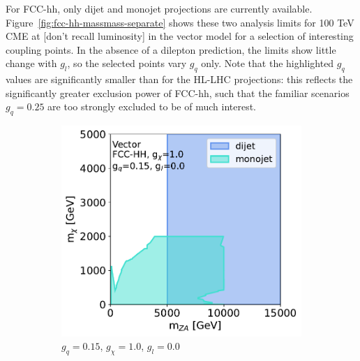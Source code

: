 \documentclass[11pt]{article}
\begin{document}
For FCC-hh, only dijet and monojet projections are currently available. Figure~\ref{fig:fcc-hh-massmass-separate} shows these two analysis limits for 100 TeV CME at [don't recall luminosity] in the vector model for a selection of interesting coupling points. In the absence of a dilepton prediction, the limits show little change with $g_{l}$, so the selected points vary $g_q$ only. Note that the highlighted $g_q$ values are significantly smaller than for the HL-LHC projections: this reflects the significantly greater exclusion power of FCC-hh, such that the familiar scenarios $g_q = 0.25$ are too strongly excluded to be of much interest.

\begin{figure}
     \centering
     \begin{subfigure}[b]{0.49\textwidth}
         \centering
         \includegraphics[width=\textwidth]{SummaryPlots-EF10/figures/massmass/fcc-hh/massmass_vector_gq0.15_gdm1.0_gl0.0.pdf}
         \caption{$g_q=0.15$, $g_{\chi}=1.0$, $g_l=0.0$}
         \label{subfig:vector-fcc-v1}
     \end{subfigure}
     \hfill
     \begin{subfigure}[b]{0.49\textwidth}
         \centering

\end{subfigure}
\end{figure}
\end{document}
